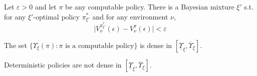 \documentclass[UTF8,11pt,colorlinks,compress,openany]{beamer}%
\begin{document}
\begin{frame}\frametitle{}
	\begin{theorem}
		Let $\varepsilon> 0$ and let $\pi$ be any
		computable policy. There is a Bayesian mixture $\xi'$ s.t. for any $\xi'$-optimal policy $\pi_{\xi'}^*$ and for any environment $\nu$,
		\[\Big|V_\nu^{\pi_{\xi'}^*}(\epsilon)-V_\nu^\pi(\epsilon)\Big|<\varepsilon\]
	\end{theorem}
	\begin{theorem}
		The set $\big\{\Upsilon_\xi(\pi): \pi \mbox{ is a computable policy}\big\}$ is dense in $\left[\underline\Upsilon_\xi,\overline\Upsilon_\xi\right]$.
	\end{theorem}
	\centerline{Deterministic policies are not dense in $\left[\underline\Upsilon_\xi,\overline\Upsilon_\xi\right]$.}
\end{frame}
\end{document}
